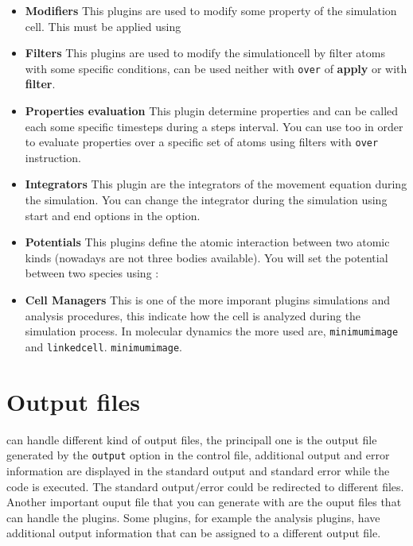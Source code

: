 \begin{itemize}
 \item \textbf{Modifiers}
  This plugins are used to modify some property of the simulation cell. This
must be applied using
 \item \textbf{Filters}
  This plugins are used to modify the simulationcell by filter atoms with some
specific conditions, can be used neither with \verb|over| of \textbf{apply} or
with \textbf{filter}.
 \item \textbf{Properties evaluation}
  This plugin determine properties and can be called each some specific
timesteps during a steps interval. You can use too in order to evaluate
properties over a specific set of atoms using filters with \verb|over|
instruction.
 \item \textbf{Integrators}
 This plugin are the integrators of the movement equation during the
simulation. You can change the integrator during the simulation using start and
end options in the option.
 \item \textbf{Potentials}
 This plugins define the atomic interaction between two atomic kinds (nowadays
are not three bodies available). You will set the potential between two species
using :
 \item \textbf{Cell Managers}
 This is one of the more imporant plugins simulations and analysis procedures,
this indicate how the cell is analyzed during the simulation process. In
molecular dynamics the more used are, \verb|minimumimage| and \verb|linkedcell|.
\verb|minimumimage|.
\end{itemize}

\section{Output files}

{\lpmd} can handle different kind of output files, the principall one is the
output file generated by the \verb|output| option in the control file,
additional output and error information are displayed in the standard output
and standard error while the code is executed. The standard output/error could
be redirected to different files. Another important ouput file that you can
generate with {\lpmd} are the ouput files that can handle the plugins. Some
plugins, for example the analysis plugins, have additional output information
that can be assigned to a different output file. 

